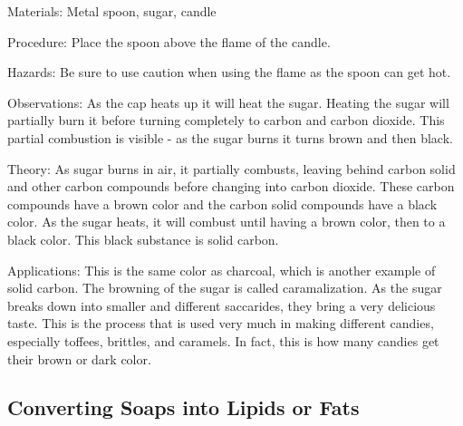 \begin{multicols}{2}

\begin{description*}
\item[Materials:]{Metal spoon, sugar, candle}
\item[Procedure:]{Place the spoon above the flame of the candle.}
\item[Hazards:]{Be sure to use caution when using the flame as the spoon can get hot.}
\item[Observations:]{As the cap heats up it will heat the sugar. Heating the sugar will partially burn it before turning completely to carbon and carbon dioxide. This partial combustion is visible - as the sugar burns it turns brown and then black.}
\item[Theory:]{As sugar burns in air, it partially combusts, leaving behind carbon solid and other carbon compounds before changing into carbon dioxide. These carbon compounds have a brown color and the carbon solid compounds have a black color. As the sugar heats, it will combust until having a brown color, then to a black color. This black substance is solid carbon.}
\item[Applications:]{This is the same color as charcoal, which is another example of solid carbon. The browning of the sugar is called caramalization. As the sugar breaks down into smaller and different saccarides, they bring a very delicious taste. This is the process that is used very much in making different candies, especially toffees, brittles, and caramels. In fact, this is how many candies get their brown or dark color.}
\end{description*}

\subsection{Converting Soaps into Lipids or Fats}



\end{multicols}
